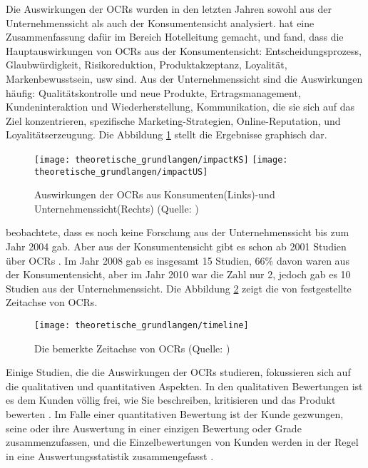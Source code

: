 Die Auswirkungen der \ac{OCRs} wurden in den letzten Jahren sowohl aus der Unternehmenssicht als auch der Konsumentensicht analysiert. \citet{SerraCantallops2014} hat eine Zusammenfassung dafür im Bereich Hotelleitung gemacht, und fand, dass die Hauptauswirkungen von \ac{OCRs} aus der Konsumentensicht: Entscheidungsprozess, Glaubwürdigkeit, Risikoreduktion, Produktakzeptanz, Loyalität, Markenbewusstsein, \ac{usw} sind. Aus der Unternehmenssicht sind die Auswirkungen häufig: Qualitätskontrolle und neue Produkte, Ertragsmanagement, Kundeninteraktion und Wiederherstellung, Kommunikation, die sie sich auf das Ziel konzentrieren, spezifische Marketing-Strategien, Online-Reputation, und Loyalitätserzeugung. Die Abbildung \ref{fig:auswirkungvonOCR} stellt die Ergebnisse graphisch dar.
\begin{figure}[htb]
\centering
	\texttt{[image: theoretische\_grundlangen/impactKS]}
	\endminipage\hfill
	\texttt{[image: theoretische\_grundlangen/impactUS]}
	\endminipage\hfill
\caption[Auswirkungen der OCRs aus Konsumenten- und Unternehmenssicht]{Auswirkungen der \ac{OCRs} aus Konsumenten(Links)-und Unternehmenssicht(Rechts) (Quelle: \citealp{SerraCantallops2014})}
\label{fig:auswirkungvonOCR}
\end{figure}

\citet{Cheung2012} beobachtete, dass es noch keine Forschung aus der Unternehmenssicht bis zum Jahr 2004 gab. Aber aus der Konsumentensicht gibt es schon ab 2001 Studien über \ac{OCRs} . Im Jahr 2008 gab es insgesamt 15 Studien,  66\% davon waren aus der Konsumentensicht, aber im Jahr 2010 war die Zahl nur 2, jedoch gab es 10 Studien aus der Unternehmenssicht.\citep{Cheung2012} Die Abbildung \ref{fig:timeline} zeigt die von \citeauthor{Cheung2012} festgestellte Zeitachse von \ac{OCRs}.

\begin{figure}[htb]
	\begin{center}
		\texttt{[image: theoretische\_grundlangen/timeline]}
		\caption[Die bemerkte Zeitachse von OCRs]{Die bemerkte Zeitachse von \ac{OCRs} (Quelle: \citealp{Cheung2012})}
		\label{fig:timeline}
	\end{center}
\end{figure}

Einige Studien, die die Auswirkungen der \ac{OCRs} studieren, fokussieren sich auf die qualitativen und quantitativen Aspekten. In den qualitativen Bewertungen ist es dem Kunden völlig frei, wie Sie beschreiben, kritisieren und das Produkt bewerten \citep{Jimenez2013226}. Im Falle einer quantitativen Bewertung ist der Kunde gezwungen, seine oder ihre Auswertung in einer einzigen Bewertung oder Grade zusammenzufassen, und die Einzelbewertungen von Kunden werden in der Regel in eine Auswertungsstatistik zusammengefasst \citep{Kostyra2015}.

